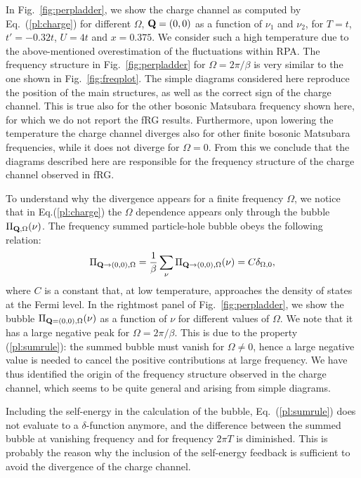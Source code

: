 In Fig.~\ref{fig:perpladder}, we show the charge channel as computed by Eq.~(\ref{pl:charge}) for different $\Omega$, $\mathbf{Q}=(0,0)$ as a function of $\nu_1$ and $\nu_2$, 
for $T=t$, $t'=-0.32t$, $U=4t$ and $x=0.375$.
We consider such a high temperature due to the above-mentioned overestimation of the fluctuations within RPA. 
The frequency structure in Fig.~\ref{fig:perpladder} for $\Omega=2\pi/ \beta$ is very similar to the one shown in Fig.~\ref{fig:freqplot}. 
The simple diagrams considered here reproduce the position of the main structures, as well as the correct sign of the charge channel. 
This is true also for the other bosonic Matsubara frequency shown here, for which we do not report the fRG results. 
Furthermore, upon lowering the temperature the charge channel diverges also for other finite bosonic Matsubara frequencies, while it does not diverge for $\Omega=0$.
From this we conclude that the diagrams described here are responsible for the frequency structure of the charge channel observed in fRG. 

To understand why the divergence appears for a finite frequency $\Omega$, we notice that in Eq.(\ref{pl:charge}) the $\Omega$ dependence 
appears only through the bubble $\Pi_{\mathbf{Q},\Omega}(\nu)$. The frequency summed particle-hole bubble obeys the following relation:  
\begin{equation}
	\Pi_{\mathbf{Q}\rightarrow(0,0),\Omega} = \frac{1}{\beta} \sum_{\nu} \Pi_{\mathbf{Q}\rightarrow(0,0),\Omega}(\nu) = C \delta_{\Omega,0},
\label{pl:sumrule}
\end{equation}
where $C$ is a constant that, at low temperature, approaches the density of states at the Fermi level.
In the rightmost panel of Fig.~\ref{fig:perpladder}, we show the bubble $\Pi_{\mathbf{Q}=(0,0),\Omega}(\nu)$ as a function of $\nu$ for different values of $\Omega$.
We note that it has a large negative peak for $\Omega=2\pi/ \beta$.
This is due to the property (\ref{pl:sumrule}): the summed 
bubble must vanish for $\Omega \neq 0$, hence a large negative value is needed to cancel the positive contributions at large frequency. 
We have thus identified the origin of the frequency structure observed in the charge channel, which seems to be quite general and arising from simple diagrams. 

Including the self-energy in the calculation of the bubble,   Eq.~(\ref{pl:sumrule}) does not evaluate to a $\delta$-function anymore, and the difference between the summed bubble at vanishing frequency and for frequency $2\pi T$ is diminished. 
This is probably the reason why the inclusion of the self-energy feedback is sufficient to avoid the divergence of the charge channel.     

